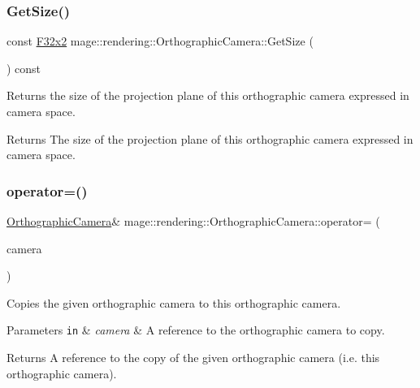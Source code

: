 \subsubsection{\texorpdfstring{Get\+Size()}{GetSize()}}
{\footnotesize\ttfamily const \mbox{\hyperlink{namespacemage_aee4759dedc8def6c6dec26b5c7eddf29}{F32x2}} mage\+::rendering\+::\+Orthographic\+Camera\+::\+Get\+Size (\begin{DoxyParamCaption}{ }\end{DoxyParamCaption}) const\hspace{0.3cm}{\ttfamily [noexcept]}}

Returns the size of the projection plane of this orthographic camera expressed in camera space.

\begin{DoxyReturn}{Returns}
The size of the projection plane of this orthographic camera expressed in camera space. 
\end{DoxyReturn}
\mbox{\label{classmage_1_1rendering_1_1_orthographic_camera_adcd0a977ed5245aa4224dd1a679586f7}} 
\subsubsection{\texorpdfstring{operator=()}{operator=()}\hspace{0.1cm}{\footnotesize\ttfamily [1/2]}}
{\footnotesize\ttfamily \mbox{\hyperlink{classmage_1_1rendering_1_1_orthographic_camera}{Orthographic\+Camera}}\& mage\+::rendering\+::\+Orthographic\+Camera\+::operator= (\begin{DoxyParamCaption}\item[{const \mbox{\hyperlink{classmage_1_1rendering_1_1_orthographic_camera}{Orthographic\+Camera}} \&}]{camera }\end{DoxyParamCaption})\hspace{0.3cm}{\ttfamily [delete]}}

Copies the given orthographic camera to this orthographic camera.


\begin{DoxyParams}[1]{Parameters}
\mbox{\tt in}  & {\em camera} & A reference to the orthographic camera to copy. \\
\hline
\end{DoxyParams}
\begin{DoxyReturn}{Returns}
A reference to the copy of the given orthographic camera (i.\+e. this orthographic camera). 
\end{DoxyReturn}
\mbox{\label{classmage_1_1rendering_1_1_orthographic_camera_aa4518e7ef41bc0d841719198ac59d41f}} 
